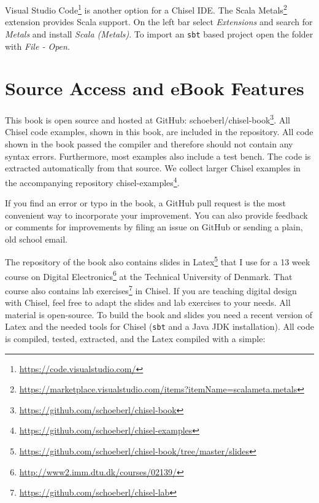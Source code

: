 \documentclass[%
    10pt,
    headinclude, footexclude,
    openright, %
    notitlepage,
    cleardoubleempty,
    headsepline,
    pointlessnumbers,
    bibtotoc, idxtotoc,
    ]{scrbook}
\newcommand{\code}[1]{{\small{\texttt{#1}}}}
\newcommand{\myref}[2]{\href{#1}{#2}}
\renewcommand{\myref}[2]{{#2}{\footnote{\url{#1}}}}
\begin{document}
\myref{https://code.visualstudio.com/}{Visual Studio Code} is another option for a Chisel IDE. 
The \myref{https://marketplace.visualstudio.com/items?itemName=scalameta.metals}{Scala Metals}
extension provides Scala support.
On the left bar select \emph{Extensions} and search for \emph{Metals} and install \emph{Scala (Metals)}.
To import an \code{sbt} based project open the folder with \emph{File - Open}. 



\section{Source Access and eBook Features}

This book is open source and hosted at GitHub: \myref{https://github.com/schoeberl/chisel-book}{schoeberl/chisel-book}.
All Chisel code examples, shown in this book, are included in the repository.
All code shown in the book passed the compiler and therefore should not contain any syntax errors.
Furthermore, most examples also include a test bench.
The code is extracted automatically from that source.
We collect larger Chisel examples in the accompanying repository \myref{https://github.com/schoeberl/chisel-examples}{chisel-examples}.

If you find an error or typo in the book, a GitHub pull request is the most convenient way to incorporate your improvement.
You can also provide feedback or comments for improvements by filing an issue on GitHub
or sending a plain, old school email.

The repository of the book also contains
\myref{https://github.com/schoeberl/chisel-book/tree/master/slides}{slides in Latex}
that I use for a 13 week course on
\myref{http://www2.imm.dtu.dk/courses/02139/}{Digital Electronics} at the
Technical University of Denmark.
That course also contains \myref{https://github.com/schoeberl/chisel-lab}{lab exercises}
in Chisel.
If you are teaching digital design with Chisel, feel free to adapt the slides and lab
exercises to your needs. All material is open-source. To build the book and slides
you need a recent version of Latex and the needed tools for Chisel (\code{sbt} and
a Java JDK installation). All code is compiled, tested, extracted, and the Latex compiled with
a simple:
\end{document}
